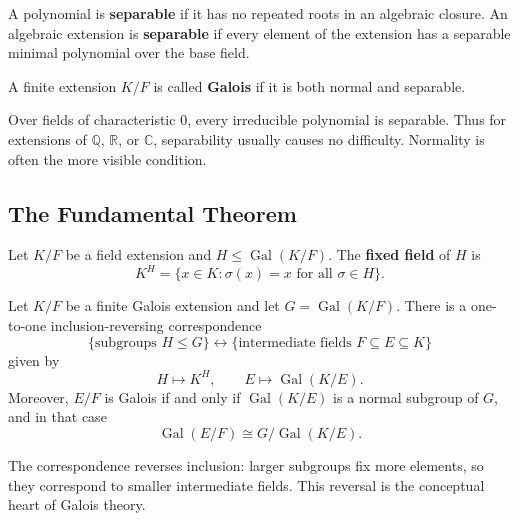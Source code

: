 \begin{definition}
A polynomial is \textbf{separable} if it has no repeated roots in an algebraic closure. An algebraic extension is \textbf{separable} if every element of the extension has a separable minimal polynomial over the base field.
\end{definition}

\begin{definition}
A finite extension $K/F$ is called \textbf{Galois} if it is both normal and separable.
\end{definition}

\begin{remark}
Over fields of characteristic $0$, every irreducible polynomial is separable. Thus for extensions of $\mathbb{Q}$, $\mathbb{R}$, or $\mathbb{C}$, separability usually causes no difficulty. Normality is often the more visible condition.
\end{remark}

\subsection{The Fundamental Theorem}

\begin{definition}
Let $K/F$ be a field extension and $H\leq\operatorname{Gal}(K/F)$. The \textbf{fixed field} of $H$ is
\[
    K^H=\{x\in K:\sigma(x)=x\text{ for all }\sigma\in H\}.
\]
\end{definition}


\begin{theorem}
Let $K/F$ be a finite Galois extension and let $G=\operatorname{Gal}(K/F)$. There is a one-to-one inclusion-reversing correspondence
\[
    \{\text{subgroups }H\leq G\}
    \longleftrightarrow
    \{\text{intermediate fields }F\subseteq E\subseteq K\}
\]
given by
\[
    H\mapsto K^H,
    \qquad
    E\mapsto \operatorname{Gal}(K/E).
\]
Moreover, $E/F$ is Galois if and only if $\operatorname{Gal}(K/E)$ is a normal subgroup of $G$, and in that case
\[
    \operatorname{Gal}(E/F)\cong G/\operatorname{Gal}(K/E).
\]
\end{theorem}

\begin{remark}
The correspondence reverses inclusion: larger subgroups fix more elements, so they correspond to smaller intermediate fields. This reversal is the conceptual heart of Galois theory.
\end{remark}

